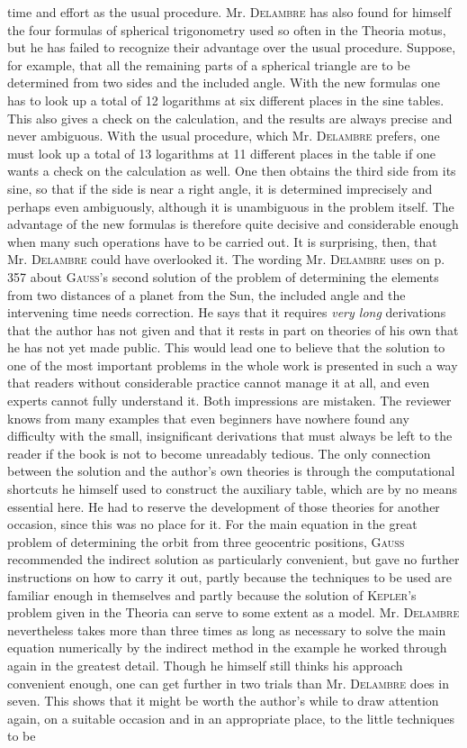 time and effort as the usual procedure. Mr. \textsc{Delambre} has also found for himself the four formulas of spherical trigonometry used so often in the Theoria motus, but he has failed to recognize their advantage over the usual procedure. Suppose, for example, that all the remaining parts of a spherical triangle are to be determined from two sides and the included angle. With the new formulas one has to look up a total of 12 logarithms at six different places in the sine tables. This also gives a check on the calculation, and the results are always precise and never ambiguous. With the usual procedure, which Mr. \textsc{Delambre} prefers, one must look up a total of 13 logarithms at 11 different places in the table if one wants a check on the calculation as well. One then obtains the third side from its sine, so that if the side is near a right angle, it is determined imprecisely and perhaps even ambiguously, although it is unambiguous in the problem itself. The advantage of the new formulas is therefore quite decisive and considerable enough when many such operations have to be carried out. It is surprising, then, that Mr. \textsc{Delambre} could have overlooked it. The wording Mr. \textsc{Delambre} uses on p.\,357 about \textsc{Gauss}'s second solution of the problem of determining the elements from two distances of a planet from the Sun, the included angle and the intervening time needs correction. He says that it requires \emph{very long} derivations that the author has not given and that it rests in part on theories of his own that he has not yet made public. This would lead one to believe that the solution to one of the most important problems in the whole work is presented in such a way that readers without considerable practice cannot manage it at all, and even experts cannot fully understand it. Both impressions are mistaken. The reviewer knows from many examples that even beginners have nowhere found any difficulty with the small, insignificant derivations that must always be left to the reader if the book is not to become unreadably tedious. The only connection between the solution and the author's own theories is through the computational shortcuts he himself used to construct the auxiliary table, which are by no means essential here. He had to reserve the development of those theories for another occasion, since this was no place for it. For the main equation in the great problem of determining the orbit from three geocentric positions, \textsc{Gauss} recommended the indirect solution as particularly convenient, but gave no further instructions on how to carry it out, partly because the techniques to be used are familiar enough in themselves and partly because the solution of \textsc{Kepler}'s problem given in the Theoria can serve to some extent as a model. Mr. \textsc{Delambre} nevertheless takes more than three times as long as necessary to solve the main equation numerically by the indirect method in the example he worked through again in the greatest detail. Though he himself still thinks his approach convenient enough, one can get further in two trials than Mr. \textsc{Delambre} does in seven. This shows that it might be worth the author's while to draw attention again, on a suitable occasion and in an appropriate place, to the little techniques to be 